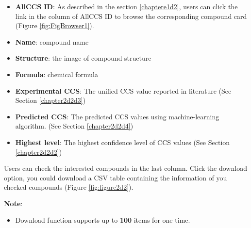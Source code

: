\documentclass[12pt,]{book}
\providecommand{\tightlist}{%
  \setlength{\itemsep}{0pt}\setlength{\parskip}{0pt}}
\theoremstyle{definition}
\theoremstyle{definition}
\theoremstyle{definition}
\theoremstyle{remark}
\begin{document}
\begin{itemize}
\tightlist
\item
  \textbf{AllCCS ID}: As described in the section \ref{chaptere1d2},
  users can click the link in the column of AllCCS ID to browse the
  corresponding compound card (Figure \ref{fig:FigBrowser1}).
\item
  \textbf{Name}: compound name
\item
  \textbf{Structure}: the image of compound structure
\item
  \textbf{Formula}: chemical formula
\item
  \textbf{Experimental CCS}: The unified CCS value reported in
  literature (See Section \ref{chapter2d2d3})
\item
  \textbf{Predicted CCS}: The predicted CCS values using
  machine-learning algorithm. (See Section \ref{chapter2d2d4})
\item
  \textbf{Highest level}: The highest confidence level of CCS values
  (See Section \ref{chapter2d2d2})
\end{itemize}

Users can check the interested compounds in the last column. Click the
download option, you could download a CSV table containing the
information of you checked compounds (Figure \ref{fig:figure2d2}).

\textbf{Note}:

\begin{itemize}
\tightlist
\item
  Download function supports up to \textbf{100} items for one time.
\end{itemize}
\end{document}
